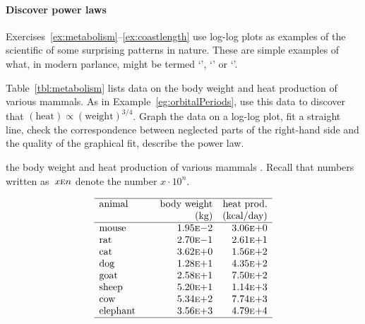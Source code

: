\paragraph{Discover power laws}
Exercises~\ref{ex:metabolism}--\ref{ex:coastlength} use log-log plots as examples of the scientific  of some surprising patterns in nature.  
These are simple examples of what, in modern parlance, might be termed `', `' or `'.

\begin{exercise} \label{ex:metabolism} 
Table~\ref{tbl:metabolism} lists data on the body weight and heat production of various mammals. 
As in Example~\ref{eg:orbitalPeriods}, use this data to discover  that \((\text{heat})\propto(\text{weight})^{3/4}\).  
Graph the data on a log-log plot, fit a straight line, check the correspondence between neglected parts of the right-hand side and the quality of the graphical fit, describe the power law.
\setbox\ajrqrbox\hbox{}%
\marginpar{\usebox{\ajrqrbox\\[2ex]}}%
\begin{table}
\caption{the body weight and heat production of various mammals \cite[]{Kleiber1947}.  Recall that numbers written as~\(x\textsc{e}n\) denote the number \(x\cdot10^n\).}
\label{tbl:metabolism}
\begin{equation*}
\begin{array}{p{12ex}rr} \hline
animal&\text{body weight}&\text{heat prod.}\\
&(\text{kg})&\text{(kcal/day)}\\\hline
mouse&   1.95\textsc{e}{-}2 & 3.06\textsc{e}{+}0 \\
rat  &   2.70\textsc{e}{-}1 & 2.61\textsc{e}{+}1 \\
cat  &   3.62\textsc{e}{+}0 & 1.56\textsc{e}{+}2 \\
dog  &   1.28\textsc{e}{+}1 & 4.35\textsc{e}{+}2 \\
goat &   2.58\textsc{e}{+}1 & 7.50\textsc{e}{+}2 \\
sheep&   5.20\textsc{e}{+}1 & 1.14\textsc{e}{+}3 \\
cow  &   5.34\textsc{e}{+}2 & 7.74\textsc{e}{+}3 \\
elephant&3.56\textsc{e}{+}3 & 4.79\textsc{e}{+}4 \\
\hline
\end{array}
\end{equation*}
\end{table}%
\end{exercise}

